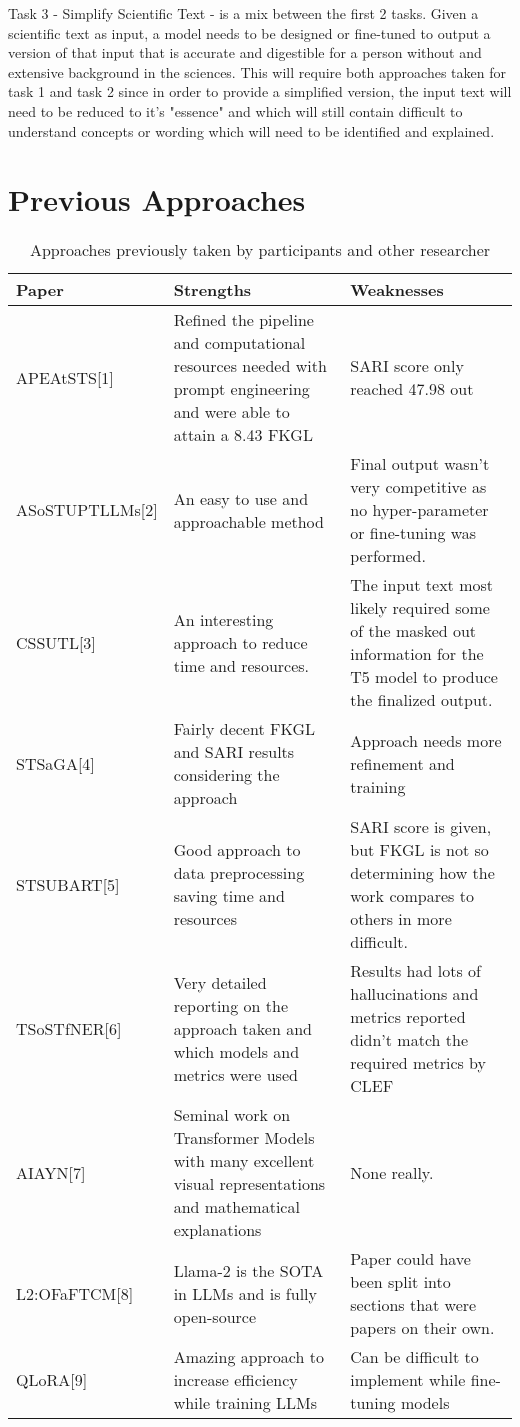 \documentclass[runningheads]{llncs}
\begin{document}
Task 3 - Simplify Scientific Text - is a mix between the first 2 tasks. Given a scientific text as input, a model needs to be designed or fine-tuned to output a version of that input that is accurate and digestible for a person without and extensive background in the sciences. This will require both approaches taken for task 1 and task 2 since in order to provide a simplified version, the input text will need to be reduced to it's "essence" and which will still contain difficult to understand concepts or wording which will need to be identified and explained.       
%
\section{Previous Approaches}
%

\begin{table}
\caption{Approaches previously taken by participants and other researcher}\label{tab1}
\begin{tabularx}{\textwidth}{|l|X|X|}
\hline
Paper & Strengths & Weaknesses\\
\hline
APEAtSTS[1] & Refined the pipeline and computational resources needed with prompt engineering and were able to attain a 8.43 FKGL & SARI score only reached 47.98 out\\
\hline
ASoSTUPTLLMs[2] & An easy to use and approachable method & Final output wasn't very competitive as no hyper-parameter or fine-tuning was performed.\\
\hline
CSSUTL[3] & An interesting approach to reduce time and resources. & The input text most likely required some of the masked out information for the T5 model to produce the finalized output.\\
\hline
STSaGA[4] & Fairly decent FKGL and SARI results considering the approach & Approach needs more refinement and training \\
\hline
STSUBART[5] & Good approach to data preprocessing saving time and resources & SARI score is given, but FKGL is not so determining how the work compares to others in more difficult. \\
\hline
TSoSTfNER[6] & Very detailed reporting on the approach taken and which models and metrics were used & Results had lots of hallucinations and metrics reported didn't match the required metrics by CLEF \\
\hline
AIAYN[7] & Seminal work on Transformer Models with many excellent visual representations and mathematical explanations & None really.\\
\hline
L2:OFaFTCM[8] & Llama-2 is the SOTA in LLMs and is fully open-source & Paper could have been split into sections that were papers on their own. \\
\hline
QLoRA[9] & Amazing approach to increase efficiency while training LLMs & Can be difficult to implement while fine-tuning models\\
\hline
\end{tabularx}
\end{table}
\end{document}
